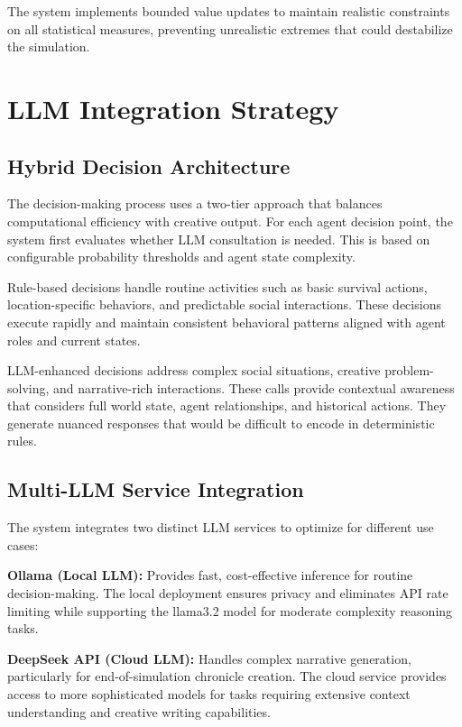 \documentclass[conference]{IEEEtran}
\begin{document}
The system implements bounded value updates to maintain realistic constraints on all statistical measures, preventing unrealistic extremes that could destabilize the simulation.

\section{LLM Integration Strategy}

\subsection{Hybrid Decision Architecture}

The decision-making process uses a two-tier approach that balances computational efficiency with creative output. For each agent decision point, the system first evaluates whether LLM consultation is needed. This is based on configurable probability thresholds and agent state complexity.

Rule-based decisions handle routine activities such as basic survival actions, location-specific behaviors, and predictable social interactions. These decisions execute rapidly and maintain consistent behavioral patterns aligned with agent roles and current states.

LLM-enhanced decisions address complex social situations, creative problem-solving, and narrative-rich interactions. These calls provide contextual awareness that considers full world state, agent relationships, and historical actions. They generate nuanced responses that would be difficult to encode in deterministic rules.

\subsection{Multi-LLM Service Integration}

The system integrates two distinct LLM services to optimize for different use cases:

\textbf{Ollama (Local LLM):} Provides fast, cost-effective inference for routine decision-making. The local deployment ensures privacy and eliminates API rate limiting while supporting the llama3.2 model for moderate complexity reasoning tasks.

\textbf{DeepSeek API (Cloud LLM):} Handles complex narrative generation, particularly for end-of-simulation chronicle creation. The cloud service provides access to more sophisticated models for tasks requiring extensive context understanding and creative writing capabilities.
\end{document}
